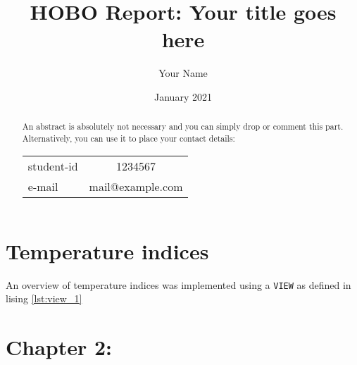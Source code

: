 \documentclass[11pt]{scrartcl}
\title{HOBO Report: Your title goes here}
\author{Your Name}
\date{January 2021}
\begin{document}
\maketitle

\begin{abstract}
    An abstract is absolutely not necessary and you can simply drop or comment this part.
    Alternatively, you can use it to place your contact details:\medskip\par 
    \begin{tabular}{lc}
       student-id  & 1234567 \\
        e-mail & mail@example.com
    \end{tabular}
\end{abstract}

\section{Temperature indices}

An overview of temperature indices was implemented using a \texttt{VIEW} as defined in lising \ref{lst:view_1}


  

\section{Chapter 2:}



\end{document}
